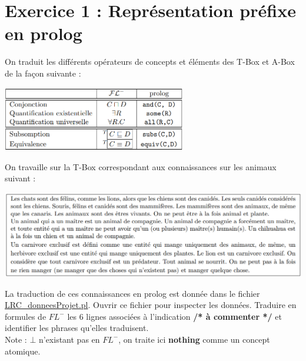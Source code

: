 \documentclass[a4paper,12pt]{report}
\begin{document}

\section*{Exercice 1 : Représentation préfixe en prolog}

On traduit les différents opérateurs de concepts et éléments des T-Box et A-Box de la façon suivante :
\begin{center}
    \includegraphics[width=0.6\textwidth]{./images/traduction_op.png}\\[1.5cm]
\end{center}

On travaille sur la T-Box correspondant aux connaissances sur les animaux suivant :
\begin{center}
    \includegraphics[width=1\textwidth]{./images/description_animaux.png}\\[1.5cm]
\end{center}

La traduction de ces connaissances en prolog est donnée dans le fichier \href{./LRC\_donneesProjet.pl}{LRC\_donneesProjet.pl}.
    Ouvrir ce fichier pour inspecter les données. Traduire en formules de \(FL^-\) les 6 lignes associées à l'indication \textbf{/* à commenter */} et
    identifier les phrases qu'elles traduisent.\\
    Note : \(\bot\) n'existant pas en \(FL^-\), on traite ici \textbf{nothing} comme un concept atomique.



\newpage
\end{document}
